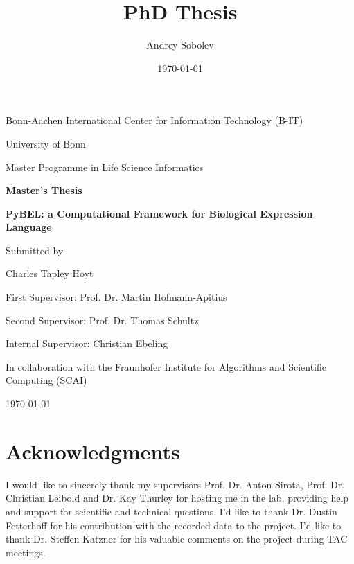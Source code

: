 \documentclass[twoside, 12pt,  footinclude=true,  headinclude=true,  cleardoublepage=empty]{scrbook}
\title{PhD Thesis}
\author{Andrey Sobolev}
\date{\today}
\begin{document}
	\begin{titlepage}
		\centering
		Bonn-Aachen International Center for Information Technology (B-IT)

		University of Bonn

		 Master Programme in Life Science Informatics

		\vspace{1in}
		 {\Large \bfseries Master's Thesis}
		\vspace{1in}

		{\LARGE \bfseries PyBEL: a Computational Framework for Biological Expression Language}
		\vspace{1in}

		{\large Submitted by}

		{\LARGE Charles Tapley Hoyt\par}

		\vspace{1in}

			First Supervisor: Prof. Dr. Martin Hofmann-Apitius
			\par
			Second Supervisor: Prof. Dr. Thomas Schultz
			\par
			Internal Supervisor: Christian Ebeling

		\vfill
		In collaboration with the Fraunhofer Institute for Algorithms and Scientific Computing (SCAI)
		\begin{flushleft}
			\today
		\end{flushleft}

	\end{titlepage}



	\frontmatter

\chapter*{Acknowledgments}

\begingroup
\setlength{\parskip}{1em}

I would like to sincerely thank my supervisors Prof. Dr. Anton Sirota, Prof. Dr. Christian Leibold and Dr. Kay Thurley for hosting me in the lab, providing help and support for scientific and technical questions. I'd like to thank Dr. Dustin Fetterhoff for his contribution with the recorded data to the project. I'd like to thank Dr. Steffen Katzner for his valuable comments on the project during TAC meetings.
\end{document}
